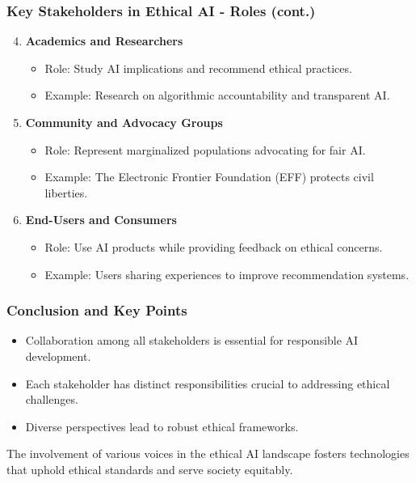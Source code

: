 \documentclass{beamer}
\begin{document}
\begin{frame}[fragile]
    \frametitle{Key Stakeholders in Ethical AI - Roles (cont.)}
    \begin{enumerate}
        \setcounter{enumi}{3}
        \item \textbf{Academics and Researchers}
        \begin{itemize}
            \item Role: Study AI implications and recommend ethical practices.
            \item Example: Research on algorithmic accountability and transparent AI.
        \end{itemize}
        
        \item \textbf{Community and Advocacy Groups}
        \begin{itemize}
            \item Role: Represent marginalized populations advocating for fair AI.
            \item Example: The Electronic Frontier Foundation (EFF) protects civil liberties.
        \end{itemize}
        
        \item \textbf{End-Users and Consumers}
        \begin{itemize}
            \item Role: Use AI products while providing feedback on ethical concerns.
            \item Example: Users sharing experiences to improve recommendation systems.
        \end{itemize}
    \end{enumerate}
\end{frame}

\begin{frame}[fragile]
    \frametitle{Conclusion and Key Points}
    \begin{itemize}
        \item Collaboration among all stakeholders is essential for responsible AI development.
        \item Each stakeholder has distinct responsibilities crucial to addressing ethical challenges.
        \item Diverse perspectives lead to robust ethical frameworks.
    \end{itemize}
    The involvement of various voices in the ethical AI landscape fosters technologies that uphold ethical standards and serve society equitably.
\end{frame}
\end{document}
